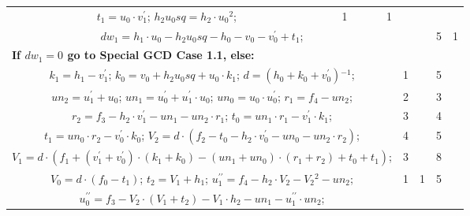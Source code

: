 \begin{tabular}{|c|cr|c|c|c|c|}
{$t_1=u_0 \cdot v^{\prime}_1$;\hspace{4pt}
$h_2u_0sq=h_2 \cdot u_0{}^{2}$;\hspace{4pt}
} & 1 & 1 &  & \\
\multicolumn{3}{|R{340pt}|}{ 
$dw_1=h_1 \cdot u_0-h_2u_0sq-h_0-v_0-v^{\prime}_0+t_1$;\hspace{4pt}
} &  &  & 5 & 1\\
\multicolumn{3}{|l|}{ 
 \bf{If $dw_1 = 0$ go to Special GCD Case 1.1, else:} } &  &  &  & \\
\multicolumn{3}{|R{340pt}|}{ 
$k_1=h_1-v^{\prime}_1$;\hspace{4pt}
$k_0=v_0+h_2u_0sq+u_0 \cdot k_1$;\hspace{4pt}
$d=(h_0+k_0+v^{\prime}_0){}^{-1}$;\hspace{4pt}
} & 1 &  & 5 & \\
\multicolumn{3}{|R{340pt}|}{ 
$un_2=u^{\prime}_1+u_0$;\hspace{4pt}
$un_1=u^{\prime}_0+u^{\prime}_1 \cdot u_0$;\hspace{4pt}
$un_0=u_0 \cdot u^{\prime}_0$;\hspace{4pt}
$r_1=f_4-un_2$;\hspace{4pt}
} & 2 &  & 3 & \\
\multicolumn{3}{|R{340pt}|}{ 
$r_2=f_3-h_2 \cdot v^{\prime}_1-un_1-un_2 \cdot r_1$;\hspace{4pt}
$t_0=un_1 \cdot r_1-v^{\prime}_1 \cdot k_1$;\hspace{4pt}
} & 3 &  & 4 & \\
\multicolumn{3}{|R{340pt}|}{ 
$t_1=un_0 \cdot r_2-v^{\prime}_0 \cdot k_0$;\hspace{4pt}
$V_2=d \cdot (f_2-t_0-h_2 \cdot v^{\prime}_0-un_0-un_2 \cdot r_2)$;\hspace{4pt}
} & 4 &  & 5 & \\
\multicolumn{3}{|R{340pt}|}{ 
$V_1=d \cdot (f_1+(v^{\prime}_1+v^{\prime}_0) \cdot (k_1+k_0)-(un_1+un_0) \cdot (r_1+r_2)+t_0+t_1)$;\hspace{4pt}
} & 3 &  & 8 & \\
\multicolumn{3}{|R{340pt}|}{ 
$V_0=d \cdot (f_0-t_1)$;\hspace{4pt}
$t_2=V_1+h_1$;\hspace{4pt}
$u^{\prime\prime}_1=f_4-h_2 \cdot V_2-V_2{}^{2}-un_2$;\hspace{4pt}
} & 1 & 1 & 5 & \\
\multicolumn{3}{|R{340pt}|}{ 
$u^{\prime\prime}_0=f_3-V_2 \cdot (V_1+t_2)-V_1 \cdot h_2-un_1-u^{\prime\prime}_1 \cdot un_2$;\hspace{4pt}
}
\end{tabular}
